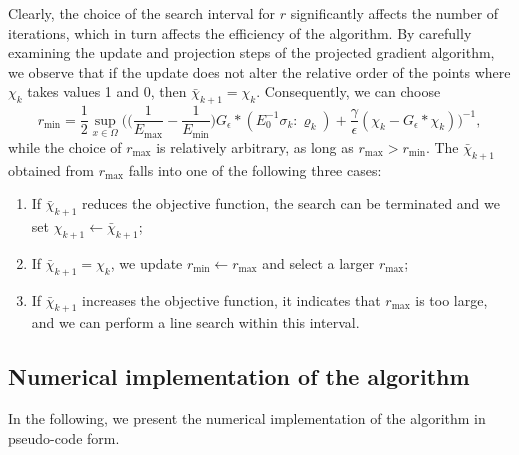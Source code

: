 \documentclass{amsart}
\begin{document}
Clearly, the choice of the search interval for \( r \) significantly affects the number of iterations, which in turn affects the efficiency of the algorithm. By carefully examining the update and projection steps of the projected gradient algorithm, we observe that if the update does not alter the relative order of the points where \(\chi_k\) takes values 1 and 0, then \(\bar{\chi}_{k+1} = \chi_k\). Consequently, we can choose
$$ r_{\min} = \dfrac{1}{2} \sup_{x\in\Omega}\Big( \Big(\dfrac{1}{E_{\max}}-\dfrac{1}{E_{\min}}\Big)G_\epsilon*(E_0^{-1}\sigma_k:\varrho_k) +\dfrac{\gamma}{\epsilon}(\chi_k-G_\epsilon*\chi_k)\Big)^{-1},$$
while the choice of \( r_{\max} \) is relatively arbitrary, as long as \( r_{\max} > r_{\min} \). The \(\bar{\chi}_{k+1}\) obtained from \( r_{\max} \) falls into one of the following three cases: 
\begin{enumerate}
    \item If \(\bar{\chi}_{k+1}\) reduces the objective function, the search can be terminated and we set \(\chi_{k+1} \leftarrow \bar{\chi}_{k+1}\); 
    \item If \(\bar{\chi}_{k+1} = \chi_k\), we update \( r_{\min} \leftarrow r_{\max} \) and select a larger \( r_{\max} \); 
    \item If \(\bar{\chi}_{k+1}\) increases the objective function, it indicates that \( r_{\max} \) is too large, and we can perform a line search within this interval.
\end{enumerate}

\subsection{Numerical implementation of the algorithm}
In the following, we present the numerical implementation of the algorithm in pseudo-code form.
\end{document}
